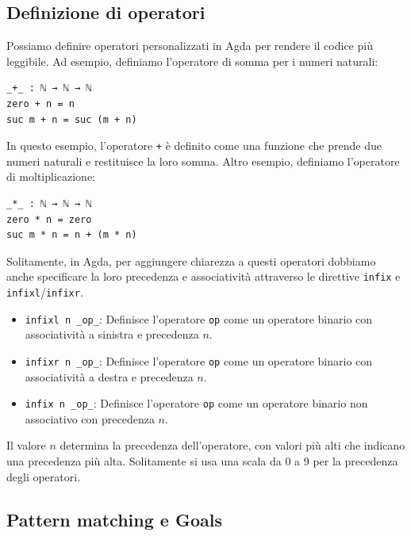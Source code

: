 \documentclass[a4paper]{article}
\theoremstyle{definition}
\theoremstyle{remark}
\begin{document}
\subsection{Definizione di operatori}
Possiamo definire operatori personalizzati in Agda per rendere il codice più leggibile.
Ad esempio, definiamo l'operatore di somma per i numeri naturali:
\begin{verbatim}
_+_ : ℕ → ℕ → ℕ
zero + n = n
suc m + n = suc (m + n)
\end{verbatim}
In questo esempio, l'operatore \texttt{+} è definito come una funzione che prende due numeri naturali e restituisce la loro somma.
Altro esempio, definiamo l'operatore di moltiplicazione:
\begin{verbatim}
_*_ : ℕ → ℕ → ℕ
zero * n = zero
suc m * n = n + (m * n)
\end{verbatim}
Solitamente, in Agda, per aggiungere chiarezza a questi operatori
dobbiamo anche specificare la loro precedenza e associatività attraverso
le direttive \texttt{infix} e \texttt{infixl}/\texttt{infixr}.
\begin{itemize}
  \item \texttt{infixl n \_op\_}: Definisce l'operatore \texttt{op} come un operatore binario con associatività a sinistra e precedenza \( n \).
  \item \texttt{infixr n \_op\_}: Definisce l'operatore \texttt{op} come un operatore binario con associatività a destra e precedenza \( n \).
  \item \texttt{infix n \_op\_}: Definisce l'operatore \texttt{op} come un operatore binario non associativo con precedenza \( n \).
\end{itemize}
Il valore $n$ determina la precedenza dell'operatore, con valori più alti che indicano una precedenza più alta.
Solitamente si usa una scala da 0 a 9 per la precedenza degli operatori.

\subsection{Pattern matching e Goals}
\end{document}
